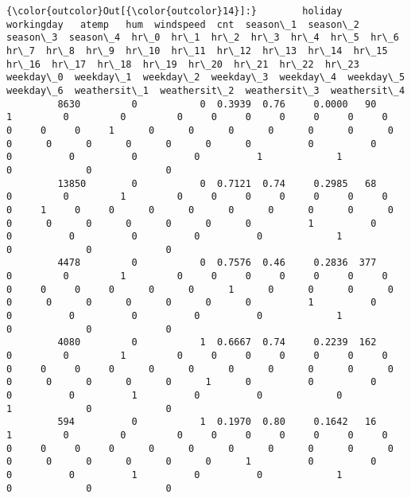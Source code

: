 \documentclass[11pt]{article}
\begin{document}
\begin{Verbatim}[commandchars=\\\{\}]
{\color{outcolor}Out[{\color{outcolor}14}]:}        holiday  workingday   atemp   hum  windspeed  cnt  season\_1  season\_2  season\_3  season\_4  hr\_0  hr\_1  hr\_2  hr\_3  hr\_4  hr\_5  hr\_6  hr\_7  hr\_8  hr\_9  hr\_10  hr\_11  hr\_12  hr\_13  hr\_14  hr\_15  hr\_16  hr\_17  hr\_18  hr\_19  hr\_20  hr\_21  hr\_22  hr\_23  weekday\_0  weekday\_1  weekday\_2  weekday\_3  weekday\_4  weekday\_5  weekday\_6  weathersit\_1  weathersit\_2  weathersit\_3  weathersit\_4
         8630         0           0  0.3939  0.76     0.0000   90         1         0         0         0     0     0     0     0     0     0     0     0     0     1      0      0      0      0      0      0      0      0      0      0      0      0      0      0          0          0          0          0          0          0          1             1             0             0             0
         13850        0           0  0.7121  0.74     0.2985   68         0         0         1         0     0     0     0     0     0     0     0     1     0     0      0      0      0      0      0      0      0      0      0      0      0      0      0      0          1          0          0          0          0          0          0             1             0             0             0
         4478         0           0  0.7576  0.46     0.2836  377         0         0         1         0     0     0     0     0     0     0     0     0     0     0      0      0      1      0      0      0      0      0      0      0      0      0      0      0          1          0          0          0          0          0          0             1             0             0             0
         4080         0           1  0.6667  0.74     0.2239  162         0         0         1         0     0     0     0     0     0     0     0     0     0     0      0      0      0      0      0      0      0      0      0      0      0      0      1      0          0          0          0          0          1          0          0             0             1             0             0
         594          0           1  0.1970  0.80     0.1642   16         1         0         0         0     0     0     0     0     0     0     0     0     0     0      0      0      0      0      0      0      0      0      0      0      0      0      0      1          0          0          0          0          1          0          0             1             0             0             0
\end{Verbatim}
            
\end{document}
